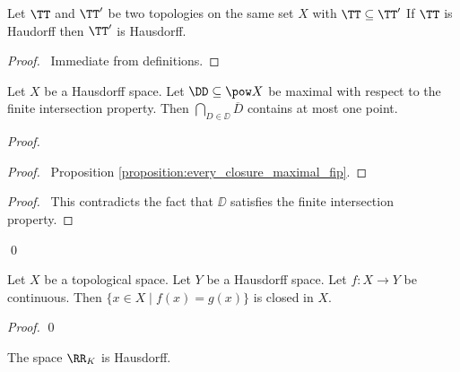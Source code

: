 \begin{proposition}
    \label{proposition:Hausdorff_finer}
    Let $\TT$ and $\TT'$ be two topologies on the same set $X$ with $\TT \subseteq \TT'$
    If $\TT$ is Haudorff then $\TT'$ is Hausdorff.
\end{proposition}

\begin{proof}
    \pf\ Immediate from definitions.
\end{proof}

\begin{proposition}
    Let $X$ be a Hausdorff space. Let $\DD \subseteq \pow X$ be maximal
    with respect to the finite intersection property. Then $\bigcap_{D \in \DD}
    \overline{D}$ contains at most one point.
\end{proposition}

\begin{proof}
    \pf
    \begin{proof}
        \pf\ Proposition \ref{proposition:every_closure_maximal_fip}.
    \end{proof}
    \qedstep
    \begin{proof}
        \pf\ This contradicts the fact that $\DD$ satisfies the finite intersection property.
    \end{proof}
    \qed
\end{proof}

\begin{proposition}
    Let $X$ be a topological space. Let $Y$ be a Hausdorff space. Let $f : X
    \rightarrow Y$ be continuous. Then $\{ x \in X \mid f(x) = g(x) \}$
    is closed in $X$.
\end{proposition}

\begin{proof}
    \pf
    \qed
\end{proof}

\begin{proposition}
    The space $\RR_K$ is Hausdorff.
\end{proposition}

